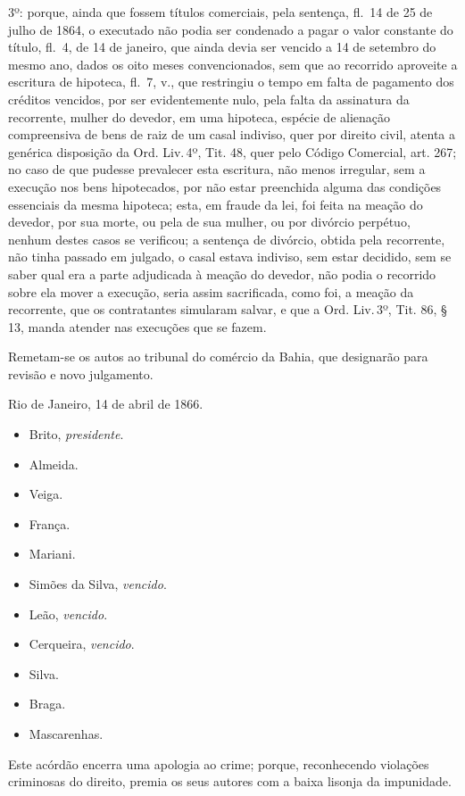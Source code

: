 3º: porque, ainda que fossem títulos comerciais, pela sentença, fl.~14
de 25 de julho de 1864, o executado não podia ser condenado a pagar o
valor constante do título, fl.~4, de 14 de janeiro, que ainda devia ser
vencido a 14 de setembro do mesmo ano, dados os oito meses
convencionados, sem que ao recorrido aproveite a escritura de hipoteca,
fl.~7, v., que restringiu o tempo em falta de pagamento dos créditos
vencidos, por ser evidentemente nulo, pela falta da assinatura da
recorrente, mulher do devedor, em uma hipoteca, espécie de alienação
compreensiva de bens de raiz de um casal indiviso, quer por direito
civil, atenta a genérica disposição da Ord. Liv.\,4º, Tit. 48, quer pelo
Código Comercial, art. 267; no caso de que pudesse prevalecer esta
escritura, não menos irregular, sem a execução nos bens hipotecados, por
não estar preenchida alguma das condições essenciais da mesma hipoteca;
esta, em fraude da lei, foi feita na meação do devedor, por sua morte,
ou pela de sua mulher, ou por divórcio perpétuo, nenhum destes casos se
verificou; a sentença de divórcio, obtida pela recorrente, não tinha
passado em julgado, o casal estava indiviso, sem estar decidido, sem se
saber qual era a parte adjudicada à meação do devedor, não podia o
recorrido sobre ela mover a execução, seria assim sacrificada, como foi,
a meação da recorrente, que os contratantes simularam salvar, e que a
Ord. Liv.\,3º, Tit. 86, § 13, manda atender nas execuções que se fazem.

Remetam-se os autos ao tribunal do comércio da Bahia, que designarão
para revisão e novo julgamento.

Rio de Janeiro, 14 de abril de 1866.

\begin{itemize}
\tightlist
\item
  Brito, \emph{presidente}.
\item
  Almeida.
\item
  Veiga.
\item
  França.
\item
  Mariani.
\item
  Simões da Silva, \emph{vencido}.
\item
  Leão, \emph{vencido}.
\item
  Cerqueira, \emph{vencido}.
\item
  Silva.
\item
  Braga.
\item
  Mascarenhas.
\end{itemize}

Este acórdão encerra uma apologia ao crime; porque, reconhecendo
violações criminosas do direito, premia os seus autores com a baixa
lisonja da impunidade.

